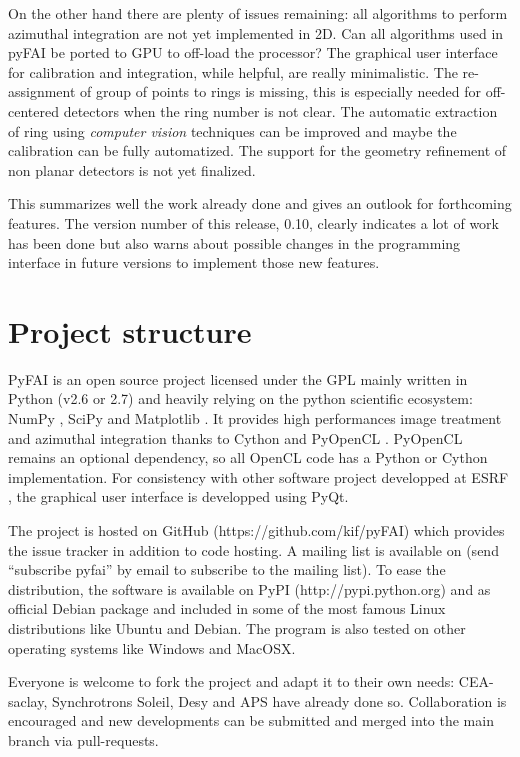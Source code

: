 \documentclass[preprint]{iucr}
\begin{document}
On the other hand there are plenty of issues remaining: all algorithms to
perform azimuthal integration are not yet implemented in 2D.
Can all algorithms used in
pyFAI be ported to GPU to off-load the processor? The graphical user interface
for calibration and integration, while helpful, are really minimalistic.
The re-assignment of group of points to rings is missing, this is
especially needed for off-centered detectors when the ring number is not clear.
The automatic extraction of ring using \textit{computer vision} techniques can
be improved and maybe the calibration can be fully automatized.
The support for the geometry refinement of non planar detectors is not yet
finalized.

This summarizes well the work already done and gives an
outlook for forthcoming features.
The version number of this release, 0.10, clearly indicates a lot of work has
been done but also warns about possible changes in the programming interface
in future versions to implement those new features.




\appendix
\section{Project structure}

PyFAI is an open source project licensed under the GPL mainly written in Python (v2.6 or 2.7)
and heavily relying on the python scientific ecosystem: NumPy \cite{numpy},
SciPy \cite{scipy} and Matplotlib \cite{matplotlib}.
It provides high performances image treatment and azimuthal integration thanks
to Cython \cite{cython} and PyOpenCL \cite{pyopencl}.
PyOpenCL remains an optional dependency, so all OpenCL code has a
Python or Cython implementation.
For consistency with other software project developped at ESRF \cite{pymca},
the graphical user interface is developped using PyQt.

The project is hosted on GitHub (https://github.com/kif/pyFAI) which provides
the issue tracker in addition to code hosting. A mailing list is available on
 (send ``subscribe pyfai'' by email to subscribe to the
mailing list).
To ease the distribution, the software is available on PyPI
(http://pypi.python.org) and as official Debian package and included in some of
the most famous Linux distributions like Ubuntu and Debian.
The program is also tested on other operating systems like Windows and
MacOSX.

Everyone is welcome to fork the project and adapt it to their own needs: CEA-saclay,
Synchrotrons Soleil, Desy and APS have already done so. Collaboration is encouraged and
new developments can be submitted and merged into the main branch
via pull-requests.
\end{document}

